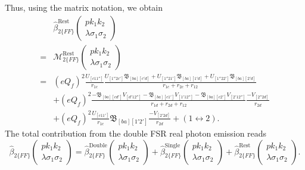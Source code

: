 Thus, using the matrix notation, we obtain
\begin{align}
&\hat{\beta}^\text{Rest}_{2\{FF\}}\left(
\begin{array}{c}
pk_1k_2\\\lambda\sigma_1\sigma_2
\end{array}\right)\nonumber\\
=&\mathcal{M}^\text{Rest}_{2\{FF\}}\left(\begin{array}{c}
pk_1k_2\\\lambda\sigma_1\sigma_2
\end{array}\right)\nonumber\\
=&(eQ_f)^2\frac{U_{[c11'']}}{r_{1c}}\frac{U_{[1''2c']}\mathfrak{B}_{[ba][c'd]}+U_{[1''21']}\mathfrak{B}_{[ba][1'd]}+U_{[1''22']}\mathfrak{B}_{[ba][2'd]}}{r_{1c}+r_{2c}+r_{12}}\nonumber\\
&+(eQ_f)^2\frac{-\mathfrak{B}_{[ba][cd']}V_{[d'12'']}-\mathfrak{B}_{[ba][c1']}V_{[1'12'']}-\mathfrak{B}_{[ba][c2']}V_{[2'12'']}}{r_{1d}+r_{2d}+r_{12}}\frac{-V_{[2''2d]}}{r_{2d}}\nonumber\\
&+(eQ_f)^2\frac{U_{[c11']}}{r_{1c}}\mathfrak{B}_{[ba][1'2']}\frac{-V_{[2'2d]}}{r_{2d}}+(1\leftrightarrow 2).
\end{align}
The total contribution from the double FSR real photon emission reads 
\begin{equation}
\hat{\beta}_{2\{FF\}}\left(\begin{array}{c}
pk_1k_2\\\lambda\sigma_1\sigma_2
\end{array}
\right)=\hat{\beta}_{2\{FF\}}^\text{Double}\left(\begin{array}{c}
pk_1k_2\\\lambda\sigma_1\sigma_2
\end{array}
\right)+\hat{\beta}_{2\{FF\}}^\text{Single}\left(\begin{array}{c}
pk_1k_2\\\lambda\sigma_1\sigma_2
\end{array}
\right)+\hat{\beta}_{2\{FF\}}^\text{Rest}\left(\begin{array}{c}
pk_1k_2\\\lambda\sigma_1\sigma_2
\end{array}
\right).
\end{equation}

